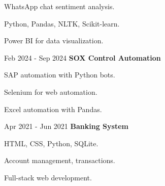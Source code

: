 \vspace{0.10 cm}
\begin{onecolentry}
\begin{highlights}
\item WhatsApp chat sentiment analysis.
\item Python, Pandas, NLTK, Scikit-learn.
\item Power BI for data visualization.
\end{highlights}
\end{onecolentry}
\vspace{0.2 cm}
\begin{twocolentry}{Feb 2024 - Sep 2024}
\textbf{SOX Control Automation}
\end{twocolentry}
\vspace{0.10 cm}
\begin{onecolentry}
\begin{highlights}
\item SAP automation with Python bots.
\item Selenium for web automation.
\item Excel automation with Pandas.
\end{highlights}
\end{onecolentry}
\vspace{0.2 cm}
\begin{twocolentry}{Apr 2021 - Jun 2021}
\textbf{Banking System}
\end{twocolentry}
\vspace{0.10 cm}
\begin{onecolentry}
\begin{highlights}
\item HTML, CSS, Python, SQLite.
\item Account management, transactions.
\item Full-stack web development.
\end{highlights}
\end{onecolentry}


